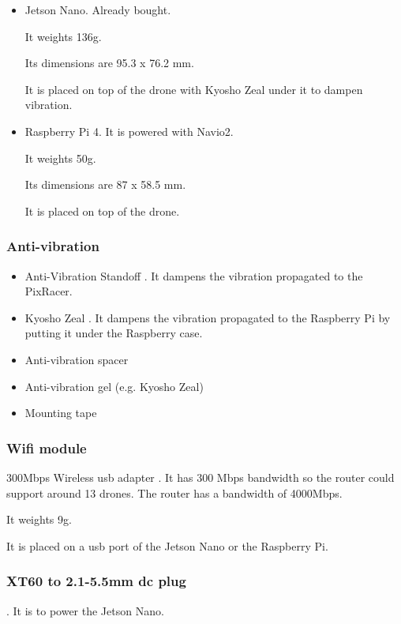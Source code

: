 \begin{itemize}
    \item Jetson Nano. Already bought.

          It weights 136g.

          Its dimensions are 95.3 x 76.2 mm.

          It is placed on top of the drone with Kyosho Zeal under it to dampen vibration.

    \item Raspberry Pi 4. It is powered with Navio2.

          It weights 50g.

          Its dimensions are 87 x 58.5 mm.

          It is placed on top of the drone.
\end{itemize}

\subsubsection{Anti-vibration}
\begin{itemize}
    \item Anti-Vibration Standoff \cite{bangood_standoff}. It dampens the vibration propagated to the PixRacer.

    \item Kyosho Zeal \cite{amazon_kyosho}. It dampens the vibration propagated to the Raspberry Pi by putting it under the Raspberry case.
\end{itemize}
\begin{itemize}
    \item Anti-vibration spacer
    \item Anti-vibration gel (e.g. Kyosho Zeal)
    \item Mounting tape
\end{itemize}

\subsubsection{Wifi module}
300Mbps Wireless usb adapter \cite{amazon_panda_wifi_module}. It has 300 Mbps bandwidth so the router could support around 13 drones. The router has a bandwidth of 4000Mbps.

It weights 9g.

It is placed on a usb port of the Jetson Nano or the Raspberry Pi.

\subsubsection{XT60 to 2.1-5.5mm dc plug}
\cite{bangood_xt60_connector}. It is to power the Jetson Nano.

